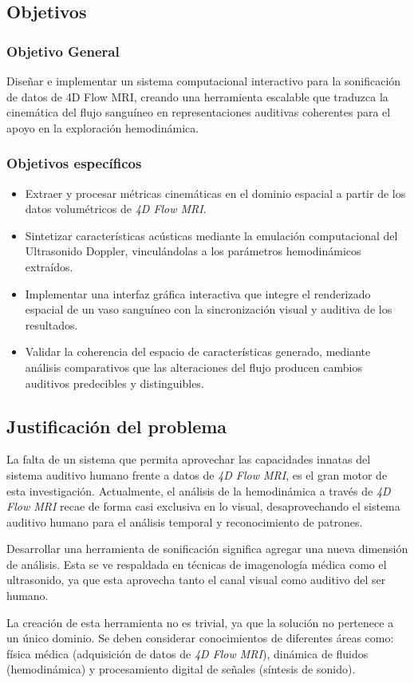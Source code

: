 \subsection{Objetivos}\label{subsection:objetivos}
\subsubsection{Objetivo General}

Diseñar e implementar un sistema computacional interactivo para la sonificación de datos de 4D Flow MRI, creando una herramienta escalable que traduzca la cinemática del flujo sanguíneo en representaciones auditivas coherentes para el apoyo en la exploración hemodinámica.

\subsubsection{Objetivos específicos}
\begin{itemize}
    \item Extraer y procesar métricas cinemáticas en el dominio espacial a partir de los datos volumétricos de \textit{4D Flow MRI}.
    \item Sintetizar características acústicas mediante la emulación computacional del Ultrasonido Doppler, vinculándolas a los parámetros hemodinámicos extraídos.
    \item Implementar una interfaz gráfica interactiva que integre el renderizado espacial de un vaso sanguíneo con la sincronización visual y auditiva de los resultados.
    \item Validar la coherencia del espacio de características generado, mediante análisis comparativos que las alteraciones del flujo producen cambios auditivos predecibles y distinguibles.
\end{itemize}


\subsection{Justificación del problema}

La falta de un sistema que permita aprovechar las capacidades innatas del sistema auditivo humano frente a datos de \textit{4D Flow MRI}, es el gran motor de esta investigación. Actualmente, el análisis de la hemodinámica a través de \textit{4D Flow MRI} recae de forma casi exclusiva en lo visual, desaprovechando el sistema auditivo humano para el análisis temporal y reconocimiento de patrones. 

Desarrollar una herramienta de sonificación significa agregar una nueva dimensión de análisis. Esta se ve respaldada en técnicas de imagenología médica como el ultrasonido, ya que esta aprovecha tanto el canal visual como auditivo del ser humano.

La creación de esta herramienta no es trivial, ya que la solución no pertenece a un único dominio. Se deben considerar conocimientos de diferentes áreas como: física médica (adquisición de datos de \textit{4D Flow MRI}), dinámica de fluidos (hemodinámica) y procesamiento digital de señales (síntesis de sonido). 
